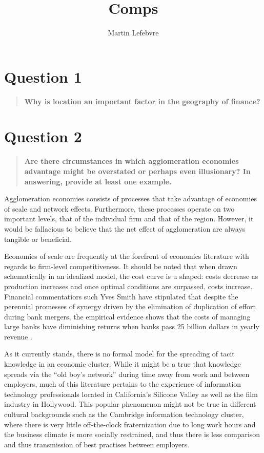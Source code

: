 \documentclass[12pt,letterpaper,notitlepage,onecolumn,final,openbib]{article}
\author{Martin Lefebvre}
\title{Comps}
\begin{document}
 
	
\section{Question 1}
\begin{quotation}
	\textbf{Why is location an important factor in the geography of finance?}
\end{quotation}



\section{Question 2}
\begin{quotation}
	\textbf{Are there circumstances in which agglomeration economies advantage might be overstated or perhaps even illusionary? In answering, provide at least one example.}
\end{quotation}

Agglomeration economies consists of processes that take advantage of economies of scale and network effects.  Furthermore, these processes operate on two important levels, that of the individual firm and that of the region.  However, it would be fallacious to believe that the net effect of agglomeration are always tangible or beneficial.   

Economies of scale are frequently at the forefront of economics literature \cite{Panzar1977} with regards to firm-level competitiveness.  It should be noted that when drawn schematically in an idealized model, the cost curve is u shaped: costs decrease as production increases and once optimal conditions are surpassed, costs increase.  Financial commentatiors such Yves Smith have stipulated that despite the perennial promesses of synergy driven by the elimination of duplication of effort during bank mergers, the empirical evidence shows that the costs of managing large banks have diminishing returns when banks pass 25 billion dollars in yearly revenue \cite{Smith2010}.  





As it currently stands, there is no formal model for the spreading of tacit knowledge in an economic cluster.  While it might be a true that knowledge spreads via the ``old boy's network'' during time away from work and between employers, much of this literature pertains to the experience of information technology professionals located in California's Silicone Valley as well as the film industry in Hollywood.  This popular phenomenon might not be true in different cultural backgrounds such as the Cambridge information technology cluster, where there is very little off-the-clock fraternization due to long work hours and the business climate is more socially restrained, and thus there is less comparison and thus transmission of best practises between employers.       
\end{document}
